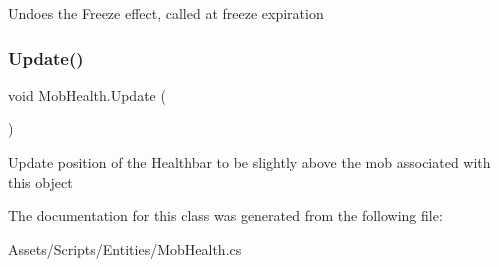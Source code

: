 Undoes the Freeze effect, called at freeze expiration \mbox{\label{class_mob_health_a0652c8b5a2fcb5cb791eb26305425024}} 
\subsubsection{\texorpdfstring{Update()}{Update()}}
{\footnotesize\ttfamily void Mob\+Health.\+Update (\begin{DoxyParamCaption}{ }\end{DoxyParamCaption})\hspace{0.3cm}{\ttfamily [private]}}

Update position of the Healthbar to be slightly above the mob associated with this object 

The documentation for this class was generated from the following file\+:\begin{DoxyCompactItemize}
\item 
Assets/\+Scripts/\+Entities/Mob\+Health.\+cs\end{DoxyCompactItemize}
